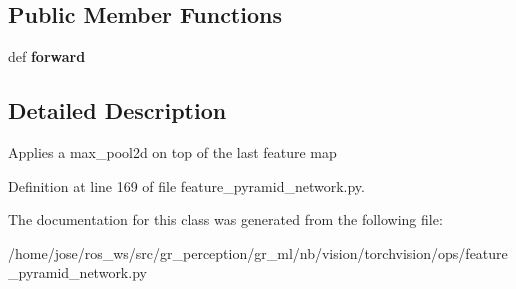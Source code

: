 \subsection*{Public Member Functions}
\begin{DoxyCompactItemize}
\item 
\mbox{\label{classtorchvision_1_1ops_1_1feature__pyramid__network_1_1LastLevelMaxPool_ab71f4601b8fb4ad8660cff8ef9625f00}} 
def {\bfseries forward}
\end{DoxyCompactItemize}


\subsection{Detailed Description}
\begin{DoxyVerb}Applies a max_pool2d on top of the last feature map
\end{DoxyVerb}
 

Definition at line 169 of file feature\+\_\+pyramid\+\_\+network.\+py.



The documentation for this class was generated from the following file\+:\begin{DoxyCompactItemize}
\item 
/home/jose/ros\+\_\+ws/src/gr\+\_\+perception/gr\+\_\+ml/nb/vision/torchvision/ops/feature\+\_\+pyramid\+\_\+network.\+py\end{DoxyCompactItemize}

